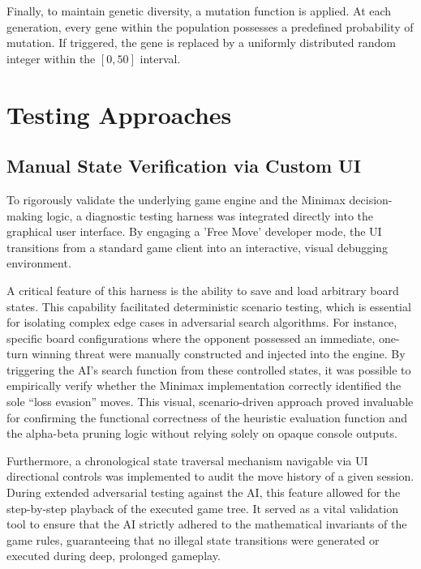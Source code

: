 Finally, to maintain genetic diversity, a mutation function is applied. At each generation, every gene within the population possesses a predefined probability of mutation. If triggered, the gene is replaced by a uniformly distributed random integer within the $[0, 50]$ interval.






\section{Testing Approaches}

\subsection{Manual State Verification via Custom UI} \label{sec:freemove}
To rigorously validate the underlying game engine and the Minimax decision-making logic, a diagnostic testing harness was integrated directly into the graphical user interface. By engaging a 'Free Move' developer mode, the UI transitions from a standard game client into an interactive, visual debugging environment.

A critical feature of this harness is the ability to save and load arbitrary board states. This capability facilitated deterministic scenario testing, which is essential for isolating complex edge cases in adversarial search algorithms. For instance, specific board configurations where the opponent possessed an immediate, one-turn winning threat were manually constructed and injected into the engine. By triggering the AI's search function from these controlled states, it was possible to empirically verify whether the Minimax implementation correctly identified the sole ``loss evasion'' moves. This visual, scenario-driven approach proved invaluable for confirming the functional correctness of the heuristic evaluation function and the alpha-beta pruning logic without relying solely on opaque console outputs.

Furthermore, a chronological state traversal mechanism navigable via UI directional controls was implemented to audit the move history of a given session. During extended adversarial testing against the AI, this feature allowed for the step-by-step playback of the executed game tree. It served as a vital validation tool to ensure that the AI strictly adhered to the mathematical invariants of the game rules, guaranteeing that no illegal state transitions were generated or executed during deep, prolonged gameplay.

